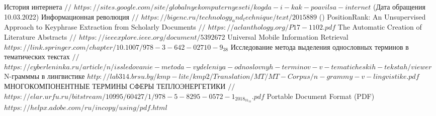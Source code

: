 \begin{thebibliography}{00}
	История интернета $//$ $https://sites.google.com/site/globalnyekomputernyeseti/kogda-i-kak-poavilsa-internet$ (Дата обращения 10.03.2022)
	Информационная революция $//$ $https://bigenc.ru/technology_and_technique/text/2015889$ ()
	PositionRank: An Unsupervised Approach to Keyphrase Extraction
	from Scholarly Documents $//$
	$https://aclanthology.org/P17-1102.pdf$
	The Automatic Creation of Literature Abstracts $//$
	$https://ieeexplore.ieee.org/document/5392672$
	Universal Mobile Information Retrieval
	$https://link.springer.com/chapter/10.1007/978-3-642-02710-9_38$
	Исследование метода выделения однословных терминов в тематических текстах $//$
	$https://cyberleninka.ru/article/n/issledovanie-metoda-vydeleniya-odnoslovnyh-terminov-v-tematicheskih-tekstah/viewer$	
	N-грамммы в лингвистике
	$http://lab314.brsu.by/kmp-lite/kmp2/Translation/MT/MT-Corpus/n-grammy-v-lingvistike.pdf$
	МНОГОКОМПОНЕНТНЫЕ ТЕРМИНЫ СФЕРЫ ТЕПЛОЭНЕРГЕТИКИ $//$
	$https://elar.urfu.ru/bitstream/10995/60427/1/978-5-8295-0572-1_2018_01_50.pdf$
	Portable Document Format (PDF)
	$https://helpx.adobe.com/ru/incopy/using/pdf.html$
	
	
\end{thebibliography}
